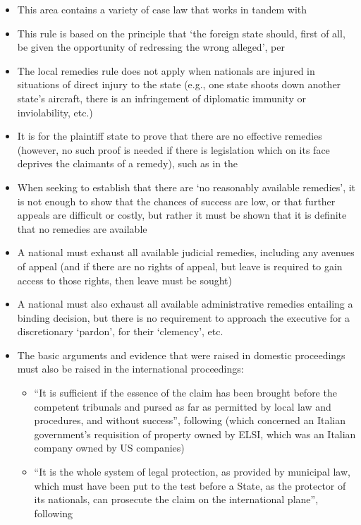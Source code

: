 \begin{itemize}
    \item This area contains a variety of case law that works in tandem with 
    \item This rule is based on the principle that `the foreign state should, first of all, be given the opportunity of redressing the wrong alleged', per 
    \item The local remedies rule does not apply when nationals are injured in situations of direct injury to the state (e.g., one state shoots down another state's aircraft, there is an infringement of diplomatic immunity or inviolability, etc.)
    \item It is for the plaintiff state to prove that there are no effective remedies (however, no such proof is needed if there is legislation which on its face deprives the claimants of a remedy), such as in the 
    \item When seeking to establish that there are `no reasonably available remedies', it is not enough to show that the chances of success are low, or that further appeals are difficult or costly, but rather it must be shown that it is definite that no remedies are available
    \item A national must exhaust all available judicial remedies, including any avenues of appeal (and if there are no rights of appeal, but leave is required to gain access to those rights, then leave must be sought)
    \item A national must also exhaust all available administrative remedies entailing a binding decision, but there is no requirement to approach the executive for a discretionary `pardon', for their `clemency', etc.
    \item The basic arguments and evidence that were raised in domestic proceedings must also be raised in the international proceedings:
    \begin{itemize}
        \item ``It is sufficient if the essence of the claim has been brought before the competent tribunals and pursed as far as permitted by local law and procedures, and without success'', following  (which concerned an Italian government's requisition of property owned by ELSI, which was an Italian company owned by US companies)
        \item ``It is the whole system of legal protection, as provided by municipal law, which must have been put to the test before a State, as the protector of its nationals, can prosecute the claim on the international plane'', following 

\end{itemize}
\end{itemize}
